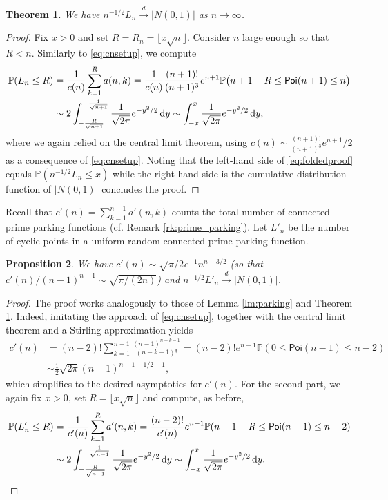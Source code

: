 \documentclass[letterpaper]{amsart}
\theoremstyle{plain}
\newtheorem{theorem}{Theorem}
\newtheorem{proposition}[theorem]{Proposition}
\theoremstyle{definition}
\theoremstyle{remark}
\newcommand{\dto}{\stackrel{d}{\longrightarrow}}
\newcommand{\floor}[1]{\lfloor #1 \rfloor}
\newcommand{\Di}{\,\mathrm{d}}
\newcommand{\IP}{\mathbb{P}}
\newcommand{\Poi}{\mathsf{Poi}}
\begin{document}
\begin{theorem}\label{thm:parking}
 We have $n^{-1/2}L_n\dto |N(0,1)|$ as $n\to\infty$. 
\end{theorem}
\begin{proof}
 Fix $x>0$ and set $R=R_n=\floor{x\sqrt{n}}$. Consider $n$ large enough so that $R<n$. Similarly to \eqref{eq:cnsetup}, we compute 
 \begin{align}\label{eq:foldedproof}
  \IP(L_n\leq R)
  &= \frac{1}{c(n)} \sum_{k=1}^R a(n,k)
   = \frac{1}{c(n)} \frac{(n+1)!}{(n+1)^3} e^{n+1} \IP\big( n+1-R \leq \Poi(n+1)\leq n \big)\notag\\
  &\sim 2 \int_{-\frac{R}{\sqrt{n+1}}}^{-\frac{1}{\sqrt{n+1}}} \frac{1}{\sqrt{2\pi}} e^{-y^2/2} \Di y
   \sim \int_{-x}^x \frac{1}{\sqrt{2\pi}}  e^{-y^2/2} \Di y,
 \end{align}
 where we again relied on the central limit theorem, using $c(n)\sim \frac{(n+1)!}{(n+1)^3} e^{n+1}/2$ as a consequence of \eqref{eq:cnsetup}. Noting that the left-hand side of \eqref{eq:foldedproof} equals $\IP(n^{-1/2}L_n \leq x)$ while the right-hand side is the cumulative distribution function of $|N(0,1)|$ concludes the proof. 
\end{proof}

Recall that $c'(n)=\sum_{k=1}^{n-1} a'(n,k)$ counts the total number of connected prime parking functions (cf. Remark \ref{rk:prime_parking}). Let $L'_n$ be the number of cyclic points in a uniform random connected prime parking function.

\begin{proposition}
 We have $c'(n)\sim \sqrt{\pi/2} e^{-1} n^{n-3/2}$ (so that $c'(n)/(n-1)^{n-1} \sim \sqrt{\pi/(2n)}$) and $n^{-1/2}L'_n\dto |N(0,1)|$.
\end{proposition}
\begin{proof}
 The proof works analogously to those of Lemma \ref{lm:parking} and Theorem \ref{thm:parking}. Indeed, imitating the approach of \eqref{eq:cnsetup}, together with the central limit theorem and a Stirling approximation yields
 \begin{align*}
  c'(n)
  &= (n-2)!\sum_{k=1}^{n-1} \frac{(n-1)^{n-k-1}}{(n-k-1)!} = (n-2)! e^{n-1} \IP(0\leq \Poi(n-1)\leq n-2)\\
  &\sim \frac{1}{2} \sqrt{2\pi} (n-1)^{n-1+1/2 -1},
 \end{align*}
 which simplifies to the desired asymptotics for $c'(n)$. For the second part, we again fix $x>0$, set $R=\floor{x\sqrt{n}}$ and compute, as before,
 \begin{align*}
  \IP(L'_n \leq R)
  &= \frac{1}{c'(n)} \sum_{k=1}^R a'(n,k)
   = \frac{(n-2)!}{c'(n)} e^{n-1} \IP(n-1-R\leq \Poi(n-1)\leq n-2) \\
  &\sim 2\int_{-\frac{R}{\sqrt{n-1}}}^{-\frac{1}{\sqrt{n-1}}} \frac{1}{\sqrt{2\pi}}  e^{-y^2/2} \Di y
   \sim \int_{-x}^x \frac{1}{\sqrt{2\pi}}  e^{-y^2/2} \Di y. \qedhere
 \end{align*}
\end{proof}
\end{document}

